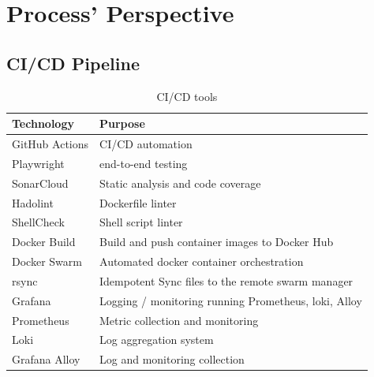 \section{Process' Perspective}

\subsection{CI/CD Pipeline}


\begin{table}[H]
      \centering
      \caption{CI/CD tools}
      \begin{tabularx}{\linewidth}{lX}
          \toprule
          \textbf{Technology} & \textbf{Purpose} \\
          \midrule
          GitHub Actions      & CI/CD automation \\
          Playwright          & end-to-end testing \\
          SonarCloud          & Static analysis and code coverage \\
          Hadolint            & Dockerfile linter \\
          ShellCheck          & Shell script linter \\
          Docker Build        & Build and push container images to Docker Hub \\
          Docker Swarm        & Automated docker container orchestration \\
          rsync               & Idempotent Sync files to the remote swarm manager \\
          Grafana             & Logging / monitoring running Prometheus, loki, Alloy \\
          Prometheus          & Metric collection and monitoring \\
          Loki                & Log aggregation system \\
          Grafana Alloy       & Log and monitoring collection \\
          \bottomrule
      \end{tabularx}
  \end{table}

